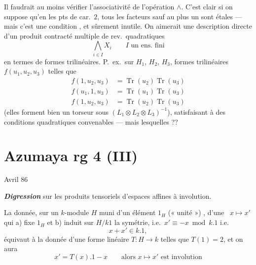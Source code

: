 \documentclass[11pt,a4paper]{article}
\begin{document}
Il faudrait au moins vérifier l'associativité de l'opération $\wedge$. C'est clair si on suppose qu'en les pts de car.\ $2$, tous les facteurs sauf au plus un sont étales --- mais c'est une condition  , et sûrement inutile. On  aimerait une description directe d'un produit contracté multiple de rev.\ quadratiques
\[
  \bigwedge_{i \in I} X_i \qquad I \text{ un ens.\ fini}
\]
\struck{\ill{}} en termes de formes trilinéaires. P.\ ex.\ sur $H_1$, $H_2$, $H_3$, formes trilinéaires  $f(u_1, u_2, u_3)$ telles que
\[
  \begin{aligned}
    f(1, u_2, u_3) &= \operatorname{Tr}(u_2)\operatorname{Tr}(u_3) \\
    f(u_1, 1, u_3) &= \operatorname{Tr}(u_1)\operatorname{Tr}(u_3) \\
    f(1, u_2, u_3) &= \operatorname{Tr}(u_2)\operatorname{Tr}(u_3)
  \end{aligned}
\]
(elles forment bien un torseur sous $(L_1 \otimes L_2 \otimes L_3)^{-1}$), satisfaisant à des conditions quadratiques convenables --- mais lesquelles ??

\section{Azumaya rg 4 (III)}

Avril 86

\textbf{\emph{Digression}} sur les produits tensoriels d'espaces affines à involution.

La donnée, sur un $k$-module $H$ muni d'un élément $1_H$ (« unité ») , d'une  \ $x \mapsto x'$ qui a) fixe $1_H$ et b) induit sur $H/k1$ la symétrie, i.e.\ $x' \equiv -x \bmod k.1$ i.e.
\[
  x + x' \in k.1 ,
\]
équivaut à la donnée d'une forme linéaire $T : H \to k$ telles que $T(1) = 2$, et on aura
\[
  x' = T(x).1 - x \qquad \text{alors } x \mapsto x' \text{ est involution}
\]
\end{document}
